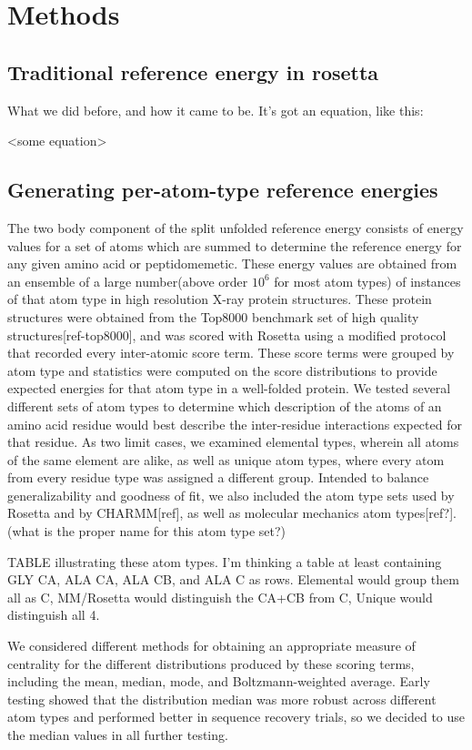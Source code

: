 \section{Methods}
\subsection{Traditional reference energy in rosetta}
What we did before, and how it came to be. It's got an equation, like this:

<some equation>


\subsection{Generating per-atom-type reference energies}

The two body component of the split unfolded reference energy consists of energy values for a set of atoms which are summed to determine the reference energy for any given amino acid or peptidomemetic. These energy values are obtained from an ensemble of a large number(above order $10^6$ for most atom types) of instances of that atom type in high resolution X-ray protein structures. These protein structures were obtained from the Top8000 benchmark set of high quality structures[ref-top8000], and was scored with Rosetta using a modified protocol that recorded every inter-atomic score term. These score terms were grouped by atom type and statistics were computed on the score distributions to provide expected energies for that atom type in a well-folded protein. We tested several different sets of atom types to determine which description of the atoms of an amino acid residue would best describe the inter-residue interactions expected for that residue. As two limit cases, we examined elemental types, wherein all atoms of the same element are alike, as well as unique atom types, where every atom from every residue type was assigned a different group. Intended to balance generalizability and goodness of fit, we also included the atom type sets used by Rosetta and by CHARMM[ref], as well as molecular mechanics atom types[ref?]. (what is the proper name for this atom type set?)

TABLE illustrating these atom types. I'm thinking a table at least containing GLY CA, ALA CA, ALA CB, and ALA C as rows. Elemental would group them all as C, MM/Rosetta would distinguish the CA+CB from C, Unique would distinguish all 4.

We considered different methods for obtaining an appropriate measure of centrality for the different distributions produced by these scoring terms, including the mean, median, mode, and Boltzmann-weighted average. Early testing showed that the distribution median was more robust across different atom types and performed better in sequence recovery trials, so we decided to use the median values in all further testing.



